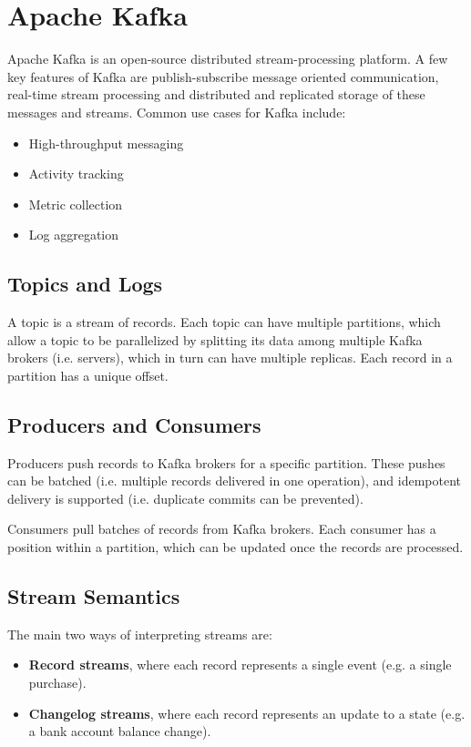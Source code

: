 \documentclass[12pt,titlepage]{article}
\begin{document}
  \newpage

  \section{Apache Kafka}
    Apache Kafka is an open-source distributed stream-processing platform. A few key features of Kafka are publish-subscribe message oriented communication,
    real-time stream processing and distributed and replicated storage of these messages and streams. Common use cases for Kafka include:
    \begin{itemize}
      \item High-throughput messaging
      \item Activity tracking
      \item Metric collection
      \item Log aggregation
    \end{itemize}

    \subsection{Topics and Logs}
      A topic is a stream of records. Each topic can have multiple partitions, which allow a topic to be parallelized by splitting its data among multiple
      Kafka brokers (i.e. servers), which in turn can have multiple replicas. Each record in a partition has a unique offset.

    \subsection{Producers and Consumers}
      Producers push records to Kafka brokers for a specific partition. These pushes can be batched (i.e. multiple records delivered in one operation), and
      idempotent delivery is supported (i.e. duplicate commits can be prevented).

      Consumers pull batches of records from Kafka brokers. Each consumer has a position within a partition, which can be updated once the records
      are processed.

    \subsection{Stream Semantics}
      The main two ways of interpreting streams are:
      \begin{itemize}
        \item \textbf{Record streams}, where each record represents a single event (e.g. a single purchase).
        \item \textbf{Changelog streams}, where each record represents an update to a state (e.g. a bank account balance change).
      \end{itemize}
\end{document}
